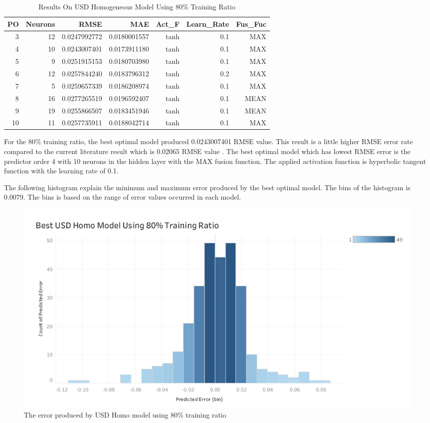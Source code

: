 \setlength{\tabcolsep}{0.5em} %
{\renewcommand{\arraystretch}{1.2}
	\begin{table}[ht]
		
		\begin{tabular}{@{}rrrrrrr@{}}
			\toprule
			\textbf{PO}&\textbf{Neurons}& \textbf{RMSE} & \textbf{MAE} & \textbf{Act\_F} & \textbf{Learn\_Rate}&\textbf{ Fus\_Fuc} \\ 
			\midrule
			 3 & 12 & 0.0247992772 & 0.0180001557 & tanh & 0.1& MAX \\ 
			 4 & 10 & 0.0243007401 & 0.0173911180 & tanh & 0.1& MAX \\ 
			 5 & 9 & 0.0251915153 & 0.0180703980 & tanh & 0.1 & MAX \\ 
			 6 & 12 & 0.0257844240 & 0.0183796312 & tanh & 0.2 & MAX \\ 
			 7 & 5 & 0.0259657339 & 0.0186208974 & tanh & 0.1 & MAX \\ 
			 8 & 16 & 0.0277265519 & 0.0196592407 & tanh & 0.1 & MEAN \\ 
			 9 & 19 & 0.0255866507 & 0.0183451946 & tanh & 0.1 & MEAN \\ 
			10 & 11 & 0.0257735911 & 0.0188042714 & tanh & 0.1 & MAX \\ 
			\hline
		\end{tabular}
		\hspace*{1cm}
		\caption{Results On USD Homogeneous Model Using 80\% Training Ratio }
	\end{table}	

For the 80\% training ratio, the best optimal model  produced 0.0243007401 RMSE value. This result  is a little higher RMSE error rate compared to the current literature result which is 0.02065 RMSE value \cite{chan:2010}. The best optimal model which has lowest RMSE error is the predictor order 4 with 10 neurons in the hidden layer with the MAX fusion function. The applied activation function is hyperbolic tangent function with the learning rate of 0.1.

The following histogram explain the minimum and maximum error produced by the best optimal model. The bins of the histogram is 0.0079. The bins is based on the range of error values occurred in each model.

\begin{figure}[hbt!]\centering
	\includegraphics[width=1\textwidth]{homo_usd_80}
	\caption{The error produced by USD Homo model using 80\% training ratio}
\end{figure}
\pagebreak

}
